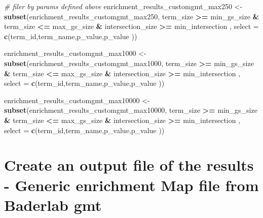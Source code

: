 \documentclass[
]{book}
\newenvironment{Shaded}{\begin{snugshade}}{\end{snugshade}}
\newcommand{\AttributeTok}[1]{\textcolor[rgb]{0.13,0.29,0.53}{#1}}
\newcommand{\CommentTok}[1]{\textcolor[rgb]{0.56,0.35,0.01}{\textit{#1}}}
\newcommand{\FunctionTok}[1]{\textcolor[rgb]{0.13,0.29,0.53}{\textbf{#1}}}
\newcommand{\NormalTok}[1]{#1}
\newcommand{\OtherTok}[1]{\textcolor[rgb]{0.56,0.35,0.01}{#1}}
\newcommand{\SpecialCharTok}[1]{\textcolor[rgb]{0.81,0.36,0.00}{\textbf{#1}}}
\begin{document}
\begin{Shaded}
\begin{Highlighting}[]
\CommentTok{\# filer by params defined above}
\NormalTok{enrichment\_results\_customgmt\_max250 }\OtherTok{\textless{}{-}} \FunctionTok{subset}\NormalTok{(enrichment\_results\_customgmt\_max250,}
\NormalTok{                                       term\_size }\SpecialCharTok{\textgreater{}=}\NormalTok{ min\_gs\_size }\SpecialCharTok{\&} 
\NormalTok{                                   term\_size }\SpecialCharTok{\textless{}=}\NormalTok{ max\_gs\_size }\SpecialCharTok{\&} 
\NormalTok{                                   intersection\_size }\SpecialCharTok{\textgreater{}=}\NormalTok{ min\_intersection , }
                                 \AttributeTok{select =} \FunctionTok{c}\NormalTok{(term\_id,term\_name,p\_value,p\_value ))}

\NormalTok{enrichment\_results\_customgmt\_max1000 }\OtherTok{\textless{}{-}} \FunctionTok{subset}\NormalTok{(enrichment\_results\_customgmt\_max1000,}
\NormalTok{                                       term\_size }\SpecialCharTok{\textgreater{}=}\NormalTok{ min\_gs\_size }\SpecialCharTok{\&} 
\NormalTok{                                   term\_size }\SpecialCharTok{\textless{}=}\NormalTok{ max\_gs\_size }\SpecialCharTok{\&} 
\NormalTok{                                   intersection\_size }\SpecialCharTok{\textgreater{}=}\NormalTok{ min\_intersection , }
                                 \AttributeTok{select =} \FunctionTok{c}\NormalTok{(term\_id,term\_name,p\_value,p\_value ))}

\NormalTok{enrichment\_results\_customgmt\_max10000 }\OtherTok{\textless{}{-}} \FunctionTok{subset}\NormalTok{(enrichment\_results\_customgmt\_max10000,}
\NormalTok{                                       term\_size }\SpecialCharTok{\textgreater{}=}\NormalTok{ min\_gs\_size }\SpecialCharTok{\&} 
\NormalTok{                                   term\_size }\SpecialCharTok{\textless{}=}\NormalTok{ max\_gs\_size }\SpecialCharTok{\&} 
\NormalTok{                                   intersection\_size }\SpecialCharTok{\textgreater{}=}\NormalTok{ min\_intersection , }
                                 \AttributeTok{select =} \FunctionTok{c}\NormalTok{(term\_id,term\_name,p\_value,p\_value ))}
\end{Highlighting}
\end{Shaded}

\hypertarget{create-an-output-file-of-the-results---generic-enrichment-map-file-from-baderlab-gmt}{%
\section{Create an output file of the results - Generic enrichment Map file from Baderlab gmt}\label{create-an-output-file-of-the-results---generic-enrichment-map-file-from-baderlab-gmt}}
\end{document}
